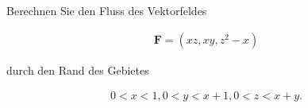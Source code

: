 
\begin{exercise}

Berechnen Sie den Fluss des Vektorfeldes

\begin{align*}
    \mathbf F = (x z, x y, z^2 - x)
\end{align*}

durch den Rand des Gebietes

\begin{align*}
    0 < x < 1,
    0 < y < x + 1,
    0 < z < x + y.
\end{align*}

\end{exercise}


